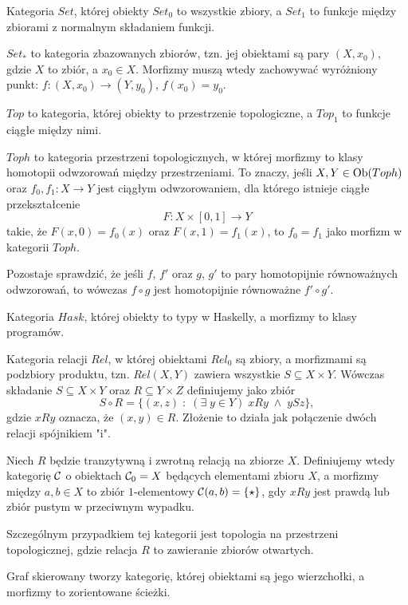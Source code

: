 \begin{example}[m]
  \item Kategoria $Set$, której obiekty $Set_0$ to wszystkie zbiory, a $Set_1$ to funkcje między zbiorami z normalnym składaniem funkcji.
  \item $Set_*$ to kategoria zbazowanych zbiorów, tzn. jej obiektami są pary $(X, x_0)$, gdzie $X$ to zbiór, a $x_0\in X$. Morfizmy muszą wtedy zachowywać wyróżniony punkt: $f:(X, x_0)\to (Y, y_0)$, $f(x_0)=y_0$.
  \item $Top$ to kategoria, której obiekty to przestrzenie topologiczne, a $Top_1$ to funkcje ciągłe między nimi.
  \item $Toph$ to kategoria przestrzeni topologicznych, w której morfizmy to klasy homotopii odwzorowań między przestrzeniami. To znaczy, jeśli $X,Y\in\operatorname{Ob}(Toph)$ oraz $f_0,f_1:X\to Y$ jest ciągłym odwzorowaniem, dla którego istnieje ciągłe przekształcenie
    $$F:X\times[0,1]\to Y$$
    takie, że $F(x, 0)=f_0(x)$ oraz $F(x, 1)=f_1(x)$, to $f_0=f_1$ jako morfizm w kategorii $Toph$.

    Pozostaje sprawdzić, że jeśli $f$, $f'$ oraz $g$, $g'$ to pary homotopijnie równoważnych odwzorowań, to wówczas $f\circ g$ jest homotopijnie równoważne $f'\circ g'$.
  \item Kategoria $Hask$, której obiekty to typy w Haskelly, a morfizmy to klasy programów.
  \item Kategoria relacji $Rel$, w której obiektami $Rel_0$ są zbiory, a morfizmami są podzbiory produktu, tzn. $Rel(X, Y)$ zawiera wszystkie $S\subseteq X\times Y$. Wówczas składanie $S\subseteq X\times Y$ oraz $R\subseteq Y\times Z$ definiujemy jako zbiór
    $$S\circ R=\{(x, z)\;:\;(\exists\;y\in Y)\;xRy\;\land\;ySz\},$$
    gdzie $xRy$ oznacza, że $(x,y)\in R$. Złożenie to działa jak połączenie dwóch relacji spójnikiem "i".
  \item Niech $R$ będzie tranzytywną i zwrotną relacją na zbiorze $X$. Definiujemy wtedy kategorię $\mathcal{C}$ o obiektach $\mathcal{C}_0=X$ będących elementami zbioru $X$, a morfizmy między $a,b\in X$ to zbiór $1$-elementowy $\mathcal{C}(a, b)=\{\star\}$, gdy $xRy$ jest prawdą lub zbiór pustym w przeciwnym wypadku.

    Szczególnym przypadkiem tej kategorii jest topologia na przestrzeni topologicznej, gdzie relacja $R$ to zawieranie zbiorów otwartych.
  \item Graf skierowany tworzy kategorię, której obiektami są jego wierzchołki, a morfizmy to zorientowane ścieżki.
\end{example}


